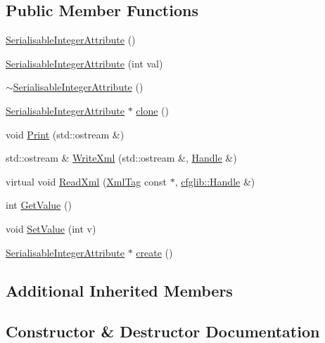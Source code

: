 \subsection*{Public Member Functions}
\begin{DoxyCompactItemize}
\item 
\hyperlink{classcfglib_1_1SerialisableIntegerAttribute_a1a5abf78432edf1fd895c00178aa198d}{Serialisable\+Integer\+Attribute} ()
\item 
\hyperlink{classcfglib_1_1SerialisableIntegerAttribute_a93a599cd2519e1b3cfa298aa24aba264}{Serialisable\+Integer\+Attribute} (int val)
\item 
\hyperlink{classcfglib_1_1SerialisableIntegerAttribute_afca7fcb22060b1fca4d4bc2aefe95e01}{$\sim$\+Serialisable\+Integer\+Attribute} ()
\item 
\hyperlink{classcfglib_1_1SerialisableIntegerAttribute}{Serialisable\+Integer\+Attribute} $\ast$ \hyperlink{classcfglib_1_1SerialisableIntegerAttribute_a105ce2b9dab265d56bc3229fcb7d6084}{clone} ()
\item 
void \hyperlink{classcfglib_1_1SerialisableIntegerAttribute_ad2f90817bfc2f4aa2f5be3064e19e11a}{Print} (std\+::ostream \&)
\item 
std\+::ostream \& \hyperlink{classcfglib_1_1SerialisableIntegerAttribute_ac9a38f025a46c97a2030e32f3c5279fa}{Write\+Xml} (std\+::ostream \&, \hyperlink{classcfglib_1_1Handle}{Handle} \&)
\item 
virtual void \hyperlink{classcfglib_1_1SerialisableIntegerAttribute_ab1a2955d8dc60ee2a23e819c1f9d4386}{Read\+Xml} (\hyperlink{classXmlTag}{Xml\+Tag} const $\ast$, \hyperlink{classcfglib_1_1Handle}{cfglib\+::\+Handle} \&)
\item 
int \hyperlink{classcfglib_1_1SerialisableIntegerAttribute_aa554b851238bb27153713ae48f5f7701}{Get\+Value} ()
\item 
void \hyperlink{classcfglib_1_1SerialisableIntegerAttribute_a23ec7f33655351cbe5121978ac67db46}{Set\+Value} (int v)
\item 
\hyperlink{classcfglib_1_1SerialisableIntegerAttribute}{Serialisable\+Integer\+Attribute} $\ast$ \hyperlink{classcfglib_1_1SerialisableIntegerAttribute_ae8b6996fa450b48c0ca1eb79cba008c2}{create} ()
\end{DoxyCompactItemize}
\subsection*{Additional Inherited Members}


\subsection{Constructor \& Destructor Documentation}
\mbox{\label{classcfglib_1_1SerialisableIntegerAttribute_a1a5abf78432edf1fd895c00178aa198d}} 
